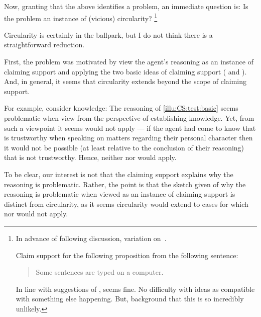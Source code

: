 \begin{note}
  Now, granting that the above identifies a problem, an immediate question is:
  Is the problem an instance of (vicious) circularity?\nolinebreak
  \footnote{
    In advance of following discussion, variation on~\textcite{Sorensen:1991wh}.

    Claim support for the following proposition from the following sentence:

    \begin{quote}
      Some sentences are typed on a computer.
    \end{quote}

    In line with suggestions of \citeauthor{Sorensen:1991wh}, seems fine.
    No difficulty with ideas as compatible with something else happening.
    But, background that this is so incredibly unlikely.
  }

  Circularity is certainly in the ballpark, but I do not think there is a straightforward reduction.
\end{note}

\begin{note}
  First, the problem was motivated by view the agent's reasoning as an instance of claiming support and applying the two basic ideas of claiming support (\ideaCSA{} and \ideaCSB{}).
  And, in general, it seems that circularity extends beyond the scope of claiming support.

  For example, consider knowledge:
  The reasoning of \autoref{illu:CS:test:basic} seems problematic when view from the perspective of establishing knowledge.
  Yet, from such a viewpoint it seems \ideaCSA{} would not apply --- if the agent had come to know that  is trustworthy when speaking on matters regarding their personal character then it would not be possible (at least relative to the conclusion of their reasoning) that  is not trustworthy.
  Hence, neither \ideaCSA{} nor \ideaCSB{} would apply.

  To be clear, our interest is not that the claiming support explains why the reasoning is problematic.
  Rather, the point is that the sketch given of why the reasoning is problematic when viewed as an instance of claiming support is distinct from circularity, as it seems circularity would extend to cases for which \ideaCSA{} nor \ideaCSB{} would not apply.
\end{note}

